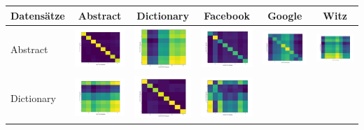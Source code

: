 \documentclass[12pt,german]{article}
\begin{document}
\begin{table}[H]
  \centering
  \begin{tabular}{| l | c | c | c | c | c |}
	\hline
	Datensätze & Abstract & Dictionary & Facebook & Google & Witz \\ 
    \hline
    Abstract &
    \includegraphics[width=2.5cm]{../images/abstractData/abstractData.jpg} &
    \includegraphics[width=2.5cm]{../images/abstractData/dictData.jpg} &
    \includegraphics[width=2.5cm]{../images/abstractData/facebookData.jpg} &
    \includegraphics[width=2.5cm]{../images/abstractData/googleData.jpg} &
    \includegraphics[width=2.5cm]{../images/abstractData/witzData.jpg} \\
    \hline
    Dictionary &
    \includegraphics[width=2.5cm]{../images/dictData/abstractData.jpg} &
    \includegraphics[width=2.5cm]{../images/dictData/dictData.jpg} &
    \includegraphics[width=2.5cm]{../images/dictData/facebookData.jpg} &

\end{tabular}
\end{table}
\end{document}
